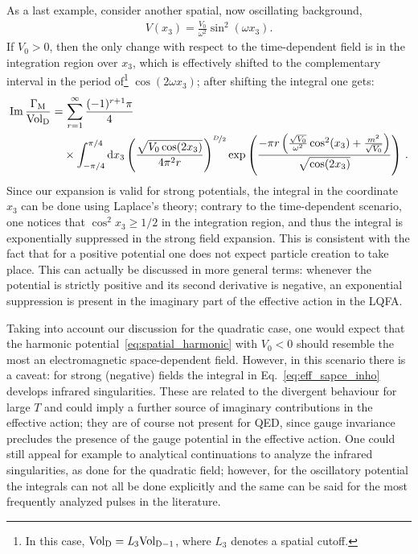 \documentclass[12pt,a4paper]{article}
\numberwithin{equation}{section}
\numberwithin{equation}{section}
\begin{document}
As a last example, consider another spatial, now oscillating background, 
\begin{align}\label{eq:spatial_harmonic}
    V(x_3)=\frac{V_0}{\omega^2} \sin^2(\omega x_3). 
\end{align}
If $V_0>0$, then the only change with respect to the time-dependent field is in the integration region over $x_3$, which is effectively shifted to the complementary interval in the period of\footnote{In this case, $\rm Vol_{D}=\mathit{L}_3 Vol_{D-1}$, where $L_3$ denotes a spatial cutoff.} $\cos (2\omega x_3)$; after shifting the integral one gets:
\begin{align}\label{eq:im_space_sine}
    \begin{split}
\operatorname{Im} \frac{\Gamma_{\rm M}}{\operatorname{Vol_{\rm D}}} 
=& \, \sum_{r=1}^{\infty}  \frac{(-1)^{r+1} \pi}{4}
\\
&
\times \int^{\pi/4}_{-\pi/4} {\rm d}x_3 \left(\frac{\sqrt{V_0 \cos(2x_3)} }{ 4\pi^2 r }\right)^{\nicefrac{D}{2}}  \mathrm{exp}\left(\frac{-\pi r \left(\frac{\sqrt{V_0}}{\omega^2} \cos^2(x_3)+\frac{m^2}{\sqrt{V_0}}\right)}{\sqrt{ \cos(2x_3)}}\right)
\,. 
\end{split}
\end{align}
Since our expansion is valid for strong potentials, the integral in the coordinate $x_3$ can be done using Laplace's theory; contrary to the time-dependent scenario,  one notices that $\cos^2 x_3\geq 1/2$ in the integration region, and thus the integral is exponentially suppressed in the strong field expansion. This is consistent with the fact that for a positive potential one does not expect particle creation to take place. This can actually be discussed in more general terms: whenever the  potential is strictly positive and its second derivative is negative, an exponential suppression is present in the imaginary part of the effective action in the LQFA. 

Taking into account our discussion for the quadratic case, one would expect that the harmonic potential~\eqref{eq:spatial_harmonic} with $V_0<0$ should resemble the most an electromagnetic space-dependent field. However, in this scenario there is a caveat: for strong (negative) fields the integral in Eq.~\eqref{eq:eff_sapce_inho} develops infrared singularities. These are related to the divergent behaviour for large $T$ and could imply a further source of imaginary contributions in the effective action; they are of course not present for QED, since gauge invariance precludes the presence of the gauge potential in the effective action. One could still appeal for example to analytical continuations to analyze the infrared singularities, as done for the quadratic field; however, for the oscillatory potential the integrals can not all be done explicitly and the same can be said for the most frequently analyzed pulses in the literature. 
\end{document}
